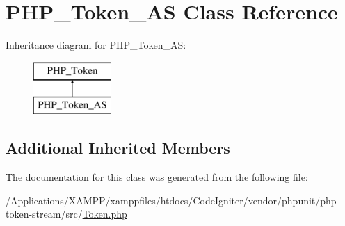 \hypertarget{class_p_h_p___token___a_s}{}\section{P\+H\+P\+\_\+\+Token\+\_\+\+AS Class Reference}
\label{class_p_h_p___token___a_s}
Inheritance diagram for P\+H\+P\+\_\+\+Token\+\_\+\+AS\+:\begin{figure}[H]
\begin{center}
\leavevmode
\includegraphics[height=2.000000cm]{class_p_h_p___token___a_s}
\end{center}
\end{figure}
\subsection*{Additional Inherited Members}


The documentation for this class was generated from the following file\+:\begin{DoxyCompactItemize}
\item 
/\+Applications/\+X\+A\+M\+P\+P/xamppfiles/htdocs/\+Code\+Igniter/vendor/phpunit/php-\/token-\/stream/src/\mbox{\hyperlink{_token_8php}{Token.\+php}}\end{DoxyCompactItemize}

